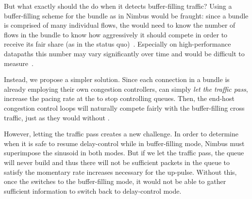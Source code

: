 But what exactly should the \inbox do when it detects buffer-filling traffic? Using a buffer-filling scheme for the bundle as in Nimbus would be fraught: since a bundle is comprised of many individual flows, the \inbox would need to know the number of flows in the bundle to know how aggressively it should compete in order to receive its fair share (as in the status quo)~\cite{multcp}. Especially on high-performance datapaths this number may vary significantly over time and would be difficult to measure~\cite{heavy-hitters}.

Instead, we propose a simpler solution.
Since each connection in a bundle is already employing their own congestion controllers, \name{} can simply \emph{let the traffic pass}, \ie{} increase the pacing rate at the \inbox to stop controlling queues.
Then, the end-host congestion control loops will naturally compete fairly with the buffer-filling cross traffic, just as they would without \name{}.

However, letting the traffic pass creates a new challenge. 
In order to determine when it is safe to resume delay-control while in buffer-filling mode, Nimbus must superimpose the sinusoid in both modes. But if we let the traffic pass, the \inbox queue will never build and thus there will not be sufficient packets in the queue to satisfy the momentary rate increases necessary for the up-pulse. Without this, once the \inbox{} switches to the buffer-filling mode, it would not be able to gather sufficient information to switch back to delay-control mode.

